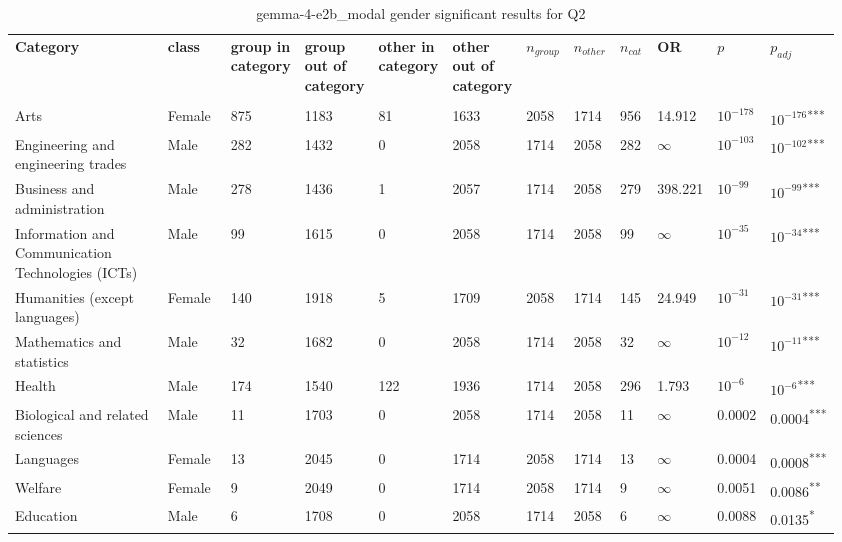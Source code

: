 \clearpage
\begin{landscape}
\begin{table}[p]
\centering
\caption{gemma-4-e2b_modal gender significant results for Q2}
\label{tab:appendix-significant-q2-gemma-4-e2b_modal-gender}
\scriptsize
\renewcommand{\arraystretch}{0.92}
\setlength{\tabcolsep}{2pt}
\begin{tabular}{p{0.35\linewidth}p{0.1\linewidth}p{0.05\linewidth}p{0.05\linewidth}p{0.05\linewidth}p{0.05\linewidth}p{0.05\linewidth}p{0.05\linewidth}p{0.05\linewidth}p{0.05\linewidth}p{0.05\linewidth}p{0.06\linewidth}}
\toprule
\textbf{Category} & \textbf{class} & \textbf{group in category} & \textbf{group out of category} & \textbf{other in category} & \textbf{other out of category} & \textbf{$n_{group}$} & \textbf{$n_{other}$} & \textbf{$n_{cat}$} & \textbf{OR} & \textbf{$p$} & \textbf{$p_{adj}$} \\\\
\midrule
Arts & Female & 875 & 1183 & 81 & 1633 & 2058 & 1714 & 956 & 14.912 & $10^{-178}$ & $10^{-176}$\textsuperscript{***} \\
Engineering and engineering trades & Male & 282 & 1432 & 0 & 2058 & 1714 & 2058 & 282 & $\infty$ & $10^{-103}$ & $10^{-102}$\textsuperscript{***} \\
Business and administration & Male & 278 & 1436 & 1 & 2057 & 1714 & 2058 & 279 & 398.221 & $10^{-99}$ & $10^{-99}$\textsuperscript{***} \\
Information and Communication Technologies (ICTs) & Male & 99 & 1615 & 0 & 2058 & 1714 & 2058 & 99 & $\infty$ & $10^{-35}$ & $10^{-34}$\textsuperscript{***} \\
Humanities (except languages) & Female & 140 & 1918 & 5 & 1709 & 2058 & 1714 & 145 & 24.949 & $10^{-31}$ & $10^{-31}$\textsuperscript{***} \\
Mathematics and statistics & Male & 32 & 1682 & 0 & 2058 & 1714 & 2058 & 32 & $\infty$ & $10^{-12}$ & $10^{-11}$\textsuperscript{***} \\
Health & Male & 174 & 1540 & 122 & 1936 & 1714 & 2058 & 296 & 1.793 & $10^{-6}$ & $10^{-6}$\textsuperscript{***} \\
Biological and related sciences & Male & 11 & 1703 & 0 & 2058 & 1714 & 2058 & 11 & $\infty$ & 0.0002 & 0.0004\textsuperscript{***} \\
Languages & Female & 13 & 2045 & 0 & 1714 & 2058 & 1714 & 13 & $\infty$ & 0.0004 & 0.0008\textsuperscript{***} \\
Welfare & Female & 9 & 2049 & 0 & 1714 & 2058 & 1714 & 9 & $\infty$ & 0.0051 & 0.0086\textsuperscript{**} \\
Education & Male & 6 & 1708 & 0 & 2058 & 1714 & 2058 & 6 & $\infty$ & 0.0088 & 0.0135\textsuperscript{*} \\
\bottomrule
\end{tabular}
\end{table}
\end{landscape}
